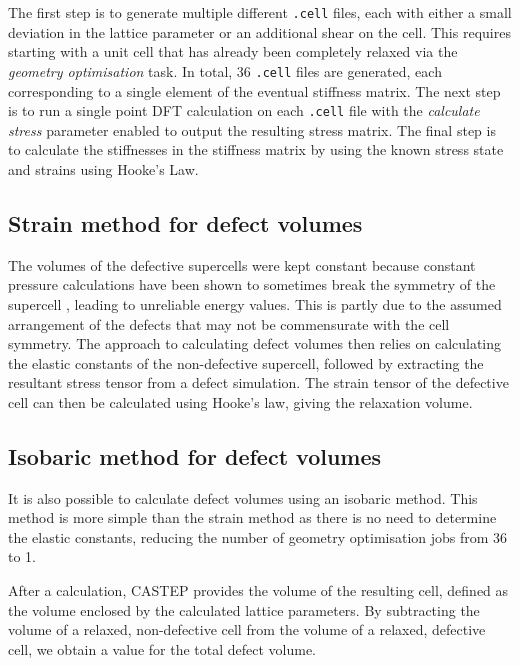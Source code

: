 The first step is to generate multiple different \texttt{.cell} files, each with either a small deviation in the lattice parameter or an additional shear on the cell. This requires starting with a unit cell that has already been completely relaxed via the \emph{geometry optimisation} task. In total, 36 \texttt{.cell} files are generated, each corresponding to a single element of the eventual stiffness matrix. The next step is to run a single point DFT calculation on each \texttt{.cell} file with the \emph{calculate stress} parameter enabled to output the resulting stress matrix. The final step is to calculate the stiffnesses in the stiffness matrix by using the known stress state and strains using Hooke's Law. 

\subsection{Strain method for defect volumes}

The volumes of the defective supercells were kept constant because constant pressure calculations have been shown to sometimes break the symmetry of the supercell \cite{samanta2010thermodynamic}, leading to unreliable energy values. This is partly due to the assumed arrangement of the defects that may not be commensurate with the cell symmetry. The approach to calculating defect volumes then relies on calculating the elastic constants of the non-defective supercell, followed by extracting the resultant stress tensor from a defect simulation. The strain tensor of the defective cell can then be calculated using Hooke's law, giving the relaxation volume. 

\subsection{Isobaric method for defect volumes}

It is also possible to calculate defect volumes using an isobaric method. This method is more simple than the strain method as there is no need to determine the elastic constants, reducing the number of geometry optimisation jobs from 36 to 1. 

After a calculation, CASTEP provides the volume of the resulting cell, defined as the volume enclosed by the calculated lattice parameters. By subtracting the volume of a relaxed, non-defective cell from the volume of a relaxed, defective cell, we obtain a value for the total defect volume. %

